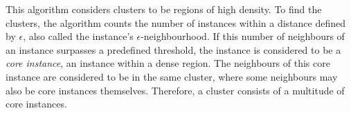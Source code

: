 This algorithm considers clusters to be regions of high density. To find the clusters, the algorithm counts the number of instances within a distance defined by $\epsilon$, also called the instance's $\epsilon$-neighbourhood. If this number of neighbours of an instance surpasses a predefined threshold, the instance is considered to be a \textit{core instance}, an instance within a dense region. The neighbours of this core instance are considered to be in the same cluster, where some neighbours may also be core instances themselves. Therefore, a cluster consists of a multitude of core instances.


